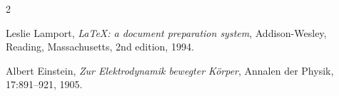 \begin{thebibliography}{2}
	
	Leslie Lamport,
	\textit{\LaTeX: a document preparation system},
	Addison-Wesley, Reading, Massachusetts,
	2nd edition, 1994. 
	
	
	
	Albert Einstein,
	\textit{Zur Elektrodynamik bewegter K{\"o}rper},
	Annalen der Physik, 17:891--921, 1905.
	
\end{thebibliography}




\renewcommand{\glossarypreamble}{\par En la siguiente sección se presentan diferentes conceptos y acrónimos, junto con sus definiciones, que son necesarios para el entendimiento completo del texto.}

\printglossaries





